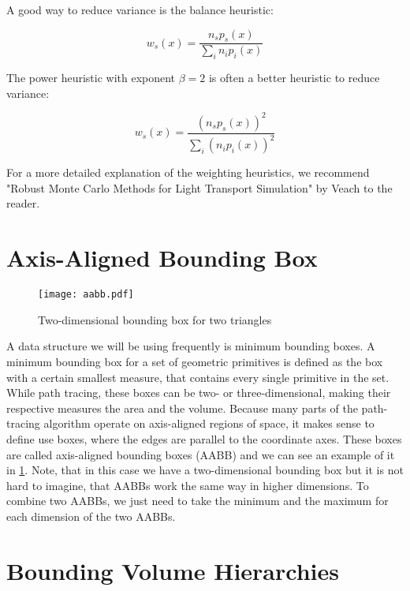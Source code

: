 A good way to reduce variance is the balance heuristic:

\begin{equation}
w_s(x) = \frac{n_s p_s(x)}{\sum_{i}n_i p_i(x)}
\end{equation}

The power heuristic with exponent $\beta = 2$ is often a better heuristic to reduce variance:

\begin{equation}
w_s(x) = \frac{(n_s p_s(x))^2}{\sum_{i}(n_i p_i(x))^2}
\end{equation}

For a more detailed explanation of the weighting heuristics, we recommend "Robust Monte Carlo Methods for Light Transport Simulation" by Veach to the reader. \cite{RMCM}

\section{Axis-Aligned Bounding Box}
\label{sec:aabb}
\begin{figure}
	\begin{center}
		\texttt{[image: aabb.pdf]}
		\caption{Two-dimensional bounding box for two triangles}
		\label{fig:aabb}
	\end{center}
\end{figure}

A data structure we will be using frequently is minimum bounding boxes. A minimum bounding box for a set of geometric primitives is defined as the box with a certain smallest measure, that contains every single primitive in the set. While path tracing, these boxes can be two- or three-dimensional, making their respective measures the area and the volume. Because many parts of the path-tracing algorithm operate on axis-aligned regions of space, it makes sense to define use boxes, where the edges are parallel to the coordinate axes. These boxes are called axis-aligned bounding boxes (AABB) and we can see an example of it in {\ref{fig:aabb}}. Note, that in this case we have a two-dimensional bounding box but it is not hard to imagine, that AABBs work the same way in higher dimensions. To combine two AABBs, we just need to take the minimum and the maximum for each dimension of the two AABBs.

\section{Bounding Volume Hierarchies}
\label{sec:preliminaries:bvh}

